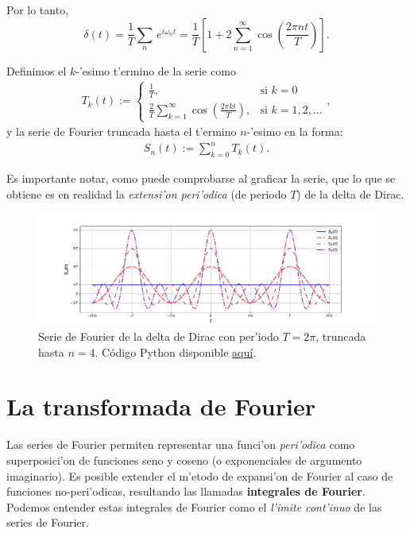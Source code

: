 Por lo tanto,
\begin{equation}
\delta(t)=\frac{1}{T}\sum_n \, e^{i\omega_n t}=\frac{1}{T}\left[1+2\sum_{n=1}^\infty\cos\left(\frac{2\pi n t}{T}\right)\right].
\end{equation}

Definimos el $k$-'esimo t'ermino de la serie como 
\begin{align}
T_{k}(t):=\left\{
\begin{array}{cl}
\frac{1}{T}, &\text{si } k=0\\
\frac{2}{T}\sum_{k=1}^{\infty}\cos\left(\frac{2\pi k t}{T}\right), &\text{si } k=1,2,\ldots
\end{array} \right. ,
\end{align}
y la serie de Fourier truncada hasta el t'ermino $n$-'esimo en la forma:
\begin{align}
S_n(t):=\sum_{k=0}^n T_{k}(t).
\end{align}

Es importante notar, como puede comprobarse al graficar la serie, que lo que se obtiene es en realidad la \textit{extensi'on peri'odica} (de periodo $T$) de la delta de Dirac.
\begin{figure}[H]
\centering
\includegraphics[scale=0.4]{figs/fig-Fourier-serie-Dirac}
\caption{Serie de Fourier de la delta de Dirac con per'iodo $T=2\pi$, truncada hasta $n=4$. Código Python disponible \href{https://github.com/gfrubi/FM2/blob/master/figuras-editables/fig-Fourier-serie-Dirac.py}{aquí}.}
\label{im:delta}
\end{figure}


\chapter{La transformada de Fourier}

Las series de Fourier permiten representar una funci'on \textit{peri'odica} como superposici'on de funciones seno y coseno (o exponenciales de argumento imaginario). Es posible extender el m'etodo de expansi'on de Fourier al caso de funciones no-peri'odicas, resultando las llamadas \textbf{integrales de Fourier}. Podemos entender estas integrales de Fourier como el \textit{l'imite cont'inuo} de las series de Fourier.

